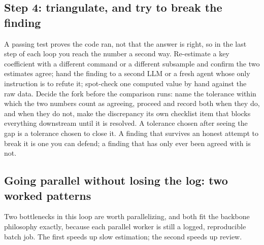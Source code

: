 \documentclass[
    a4paper,
    fontsize=10pt,
    twoside=true,
    numbers=noenddot,
]{kaobook}
\begin{document}
\subsection{Step 4: triangulate, and try to break the finding}
A passing test proves the code ran, not that the answer is right, so in the last step of each loop you reach the number a second way. Re-estimate a key coefficient with a different command or a different subsample and confirm the two estimates agree; hand the finding to a second LLM or a fresh agent whose only instruction is to refute it; spot-check one computed value by hand against the raw data. Decide the fork before the comparison runs: name the tolerance within which the two numbers count as agreeing, proceed and record both when they do, and when they do not, make the discrepancy its own checklist item that blocks everything downstream until it is resolved. A tolerance chosen after seeing the gap is a tolerance chosen to close it. A finding that survives an honest attempt to break it is one you can defend; a finding that has only ever been agreed with is not.

\subsection{Going parallel without losing the log: two worked patterns}\label{sec:backbone-parallel}
Two bottlenecks in this loop are worth parallelizing, and both fit the backbone philosophy exactly, because each parallel worker is still a logged, reproducible batch job. The first speeds up slow estimation; the second speeds up review.
\end{document}
